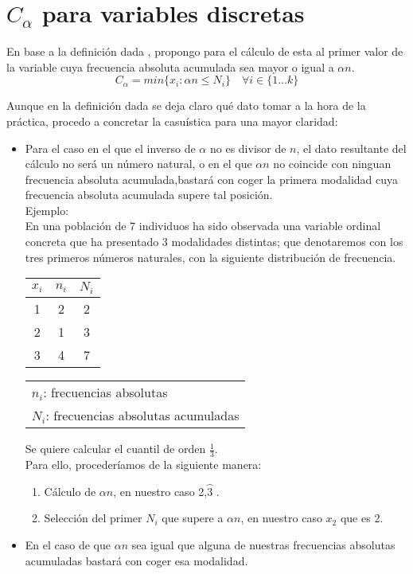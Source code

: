 \documentclass[a4paper , 11pt, spanish ]{article}
\begin{document}
\section*{$C_{ \alpha}$ para variables discretas } 
En base a la definición dada , propongo para el cálculo de esta al primer valor de la variable cuya frecuencia absoluta acumulada sea mayor o igual a $\alpha n$.
\begin{equation}
 C_{ \alpha } = min \{ x_{i} : \alpha n \leq N_{i}\} \quad \forall i \in \{1...k\}
\end{equation}
\par 
Aunque en la definición dada se deja claro qué dato tomar a la hora de la práctica, procedo a concretar la casuística para una mayor claridad:
\begin{itemize}
\item Para el caso en el que el inverso de $\alpha$ no es divisor de $n$, el dato resultante del cálculo no será un número natural, o en el que $\alpha n $  no coincide con ninguan frecuencia absoluta acumulada,bastará con coger la primera modalidad cuya frecuencia absoluta acumulada supere tal posición.   \\
Ejemplo: \\
En una población de 7 individuos ha sido observada una variable ordinal concreta que ha presentado 3 modalidades distintas; que denotaremos con los tres primeros números naturales, con la siguiente distribución de frecuencia.
\begin{table}[h]
\begin{tabular}{|c|c|c|}
\hline
$x_{i}$ & $n_{i}$ & $N_{i}$\\
\hline
1 & 2 & 2 \\
2 & 1 & 3 \\
3 & 4 &  7 \\
\hline
\end{tabular}
\centering
\begin{tabular}{l}
$n_{i}$: frecuencias absolutas \\
$N_{i}$: frecuencias absolutas acumuladas \\
\end{tabular}
\end{table}
\par
 Se quiere calcular el cuantil de orden $ \frac{1}{3}$. \\
 Para ello, procederíamos de la siguiente manera: 
 \begin{enumerate}
 \item Cálculo de $ \alpha n$, en nuestro caso 2,$\wideparen{3}$ .
 \item Selección del primer $N_{i}$ que supere a $ \alpha n$, en nuestro caso $x_{2}$ que es 2.
\end{enumerate}
\item En el caso de que $ \alpha n$ sea igual que alguna de nuestras frecuencias absolutas acumuladas bastará con coger esa modalidad. 
\end{itemize}
\end{document}
